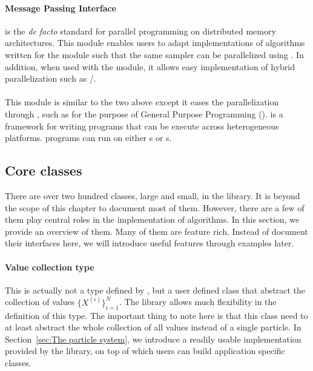 \paragraph{Message Passing Interface}

\mpi is the \emph{de facto} standard for parallel programming on distributed
memory architectures. This module enables users to adapt implementations of
algorithms written for the \smp module such that the same sampler can be
parallelized using \mpi. In addition, when used with the \smp module, it
allows easy implementation of hybrid parallelization such as \mpi/\openmp.

\paragraph{\opencl}

This module is similar to the two above except it eases the parallelization
through \opencl, such as for the purpose of General Purpose \gpu Programming
(\gpgpu). \opencl is a framework for writing programs that can be execute
across heterogeneous platforms. \opencl programs can run on either \cpu{}s or
\gpu{}s.

\subsection{Core classes}
\label{sub:Core classes}

There are over two hundred classes, large and small, in the \vsmc library. It
is beyond the scope of this chapter to document most of them. However, there
are a few of them play central roles in the implementation of \smc algorithms.
In this section, we provide an overview of them. Many of them are feature
rich. Instead of document their interfaces here, we will introduce useful
features through examples later.

\paragraph{Value collection type}

This is actually not a type defined by \vsmc, but a user defined class that
abstract the collection of values $\{X^{(i)}\}_{i=1}^N$. The library allows
much flexibility in the definition of this type. The important thing to note
here is that this class need to at least abstract the whole collection of all
values instead of a single particle. In Section~\ref{sec:The particle system},
we introduce a readily usable implementation provided by the \vsmc library, on
top of which users can build application specific classes.

